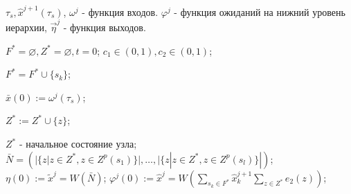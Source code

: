 		\Require $\tau_s, \hat x^{j+1}(\tau_s)$, $\omega^j$ - функция входов.
		\Ensure $\varphi^j$ - функция ожиданий на нижний уровень иерархии, $\vec\eta^j$ - функция выходов.

		\State $F^*=\varnothing,Z^*=\varnothing,t=0$; 
		\State $c_1\in(0,1), c_2\in(0,1)$;

		\Statex {}
				
		 \label{alst:init_start}
			 \label{alst:select_f}
				\State $F^*=F^*\cup\{s_k\}$;
			\EndIf
		\EndFor
		
		\State $\bar x(0):=\omega^j(\tau_s)$;
		
				 \label{alst:select_z}
					\State $Z^*:=Z^*\cup\{z\}$;
				\EndIf
			\EndFor
		\EndFor
		
		\State $Z^*$ - начальное состояние узла; \label{alst:init_state}
		\State $\bar N=(|\{z|z\in Z^*,z\in Z^p(s_1)\}|,\dots,|\{z|z\in Z^*,z\in Z^p(s_l)\}|)$; \label{alst:init_calc_out2}
		\State $\eta(0):=\tilde x^j=W(\bar N)$; \label{alst:init_calc_out3}
		\State $\varphi^j(0):=\hat x^j=W(\sum_{s_k\in F^*}\hat x_k^{j+1}\sum_{z\in Z^*}e_2(z))$;\label{alst:init_control}
		\label{alst:init_end}
